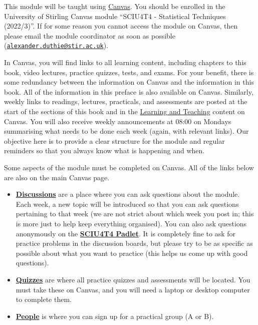 \documentclass[
]{scrbook}
\providecommand{\tightlist}{%
  \setlength{\itemsep}{0pt}\setlength{\parskip}{0pt}}
\begin{document}
This module will be taught using \href{https://canvas.stir.ac.uk/}{Canvas}.
You should be enrolled in the University of Stirling Canvas module ``SCIU4T4 - Statistical Techniques (2022/3)''.
If for some reason you cannot access the module on Canvas, then please email the module coordinator as soon as possible (\href{mailto:alexander.duthie@stir.ac.uk}{\nolinkurl{alexander.duthie@stir.ac.uk}}).

In Canvas, you will find links to all learning content, including chapters to this book, video lectures, practice quizzes, tests, and exams.
For your benefit, there is some redundancy between the information on Canvas and the information in this book.
All of the information in this preface is also available on Canvas.
Similarly, weekly links to readings, lectures, practicals, and assessments are posted at the start of the sections of this book and in the \href{https://canvas.stir.ac.uk/courses/13075/pages/learning-and-teaching}{Learning and Teaching} content on Canvas.
You will also receive weekly announcements at 08:00 on Mondays summarising what needs to be done each week (again, with relevant links).
Our objective here is to provide a clear structure for the module and regular reminders so that you always know what is happening and when.

Some aspects of the module must be completed on Canvas.
All of the links below are also on the main Canvas page.

\begin{itemize}
\tightlist
\item
  \textbf{\href{https://canvas.stir.ac.uk/courses/13075/discussion_topics}{Discussions}} are a place where you can ask questions about the module. Each week, a new topic will be introduced so that you can ask questions pertaining to that week (we are not strict about which week you post in; this is more just to help keep everything organised). You can also ask questions anonymously on the \textbf{\href{https://padlet.com/alexanderduthie/ox0i6vbgakpvb47b}{SCIU4T4 Padlet}}. It is completely fine to ask for practice problems in the discussion boards, but please try to be as specific as possible about what you want to practice (this helps us come up with good questions).
\item
  \textbf{\href{https://canvas.stir.ac.uk/courses/13075/quizzes}{Quizzes}} are where all practice quizzes and assessments will be located. You must take these on Canvas, and you will need a laptop or desktop computer to complete them.
\item
  \textbf{\href{https://canvas.stir.ac.uk/courses/13075/users}{People}} is where you can sign up for a practical group (A or B).
\end{itemize}
\end{document}
